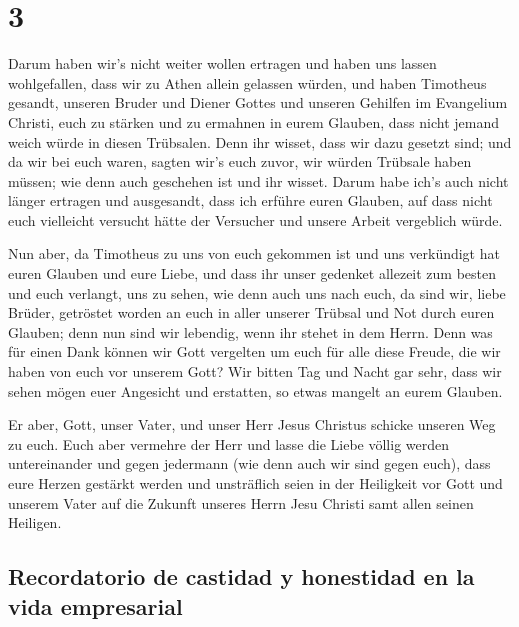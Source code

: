 \hypertarget{section-2}{%
\section{3}\label{section-2}}

 Darum haben wir's nicht weiter wollen ertragen und haben
uns lassen wohlgefallen, dass wir zu Athen allein gelassen würden,
 und haben Timotheus gesandt, unseren Bruder und Diener
Gottes und unseren Gehilfen im Evangelium Christi, euch zu stärken und
zu ermahnen in eurem Glauben,  dass nicht jemand weich
würde in diesen Trübsalen. Denn ihr wisset, dass wir dazu gesetzt sind;
 und da wir bei euch waren, sagten wir's euch zuvor, wir
würden Trübsale haben müssen; wie denn auch geschehen ist und ihr
wisset.  Darum habe ich's auch nicht länger ertragen und
ausgesandt, dass ich erführe euren Glauben, auf dass nicht euch
vielleicht versucht hätte der Versucher und unsere Arbeit vergeblich
würde.

 Nun aber, da Timotheus zu uns von euch gekommen ist und
uns verkündigt hat euren Glauben und eure Liebe, und dass ihr unser
gedenket allezeit zum besten und euch verlangt, uns zu sehen, wie denn
auch uns nach euch,  da sind wir, liebe Brüder, getröstet
worden an euch in aller unserer Trübsal und Not durch euren Glauben;
 denn nun sind wir lebendig, wenn ihr stehet in dem Herrn.
 Denn was für einen Dank können wir Gott vergelten um euch
für alle diese Freude, die wir haben von euch vor unserem Gott?
 Wir bitten Tag und Nacht gar sehr, dass wir sehen mögen
euer Angesicht und erstatten, so etwas mangelt an eurem Glauben.

 Er aber, Gott, unser Vater, und unser Herr Jesus
Christus schicke unseren Weg zu euch.  Euch aber vermehre
der Herr und lasse die Liebe völlig werden untereinander und gegen
jedermann (wie denn auch wir sind gegen euch),  dass eure
Herzen gestärkt werden und unsträflich seien in der Heiligkeit vor Gott
und unserem Vater auf die Zukunft unseres Herrn Jesu Christi samt allen
seinen Heiligen.

\hypertarget{recordatorio-de-castidad-y-honestidad-en-la-vida-empresarial}{%
\subsection{Recordatorio de castidad y honestidad en la vida
empresarial}\label{recordatorio-de-castidad-y-honestidad-en-la-vida-empresarial}}

